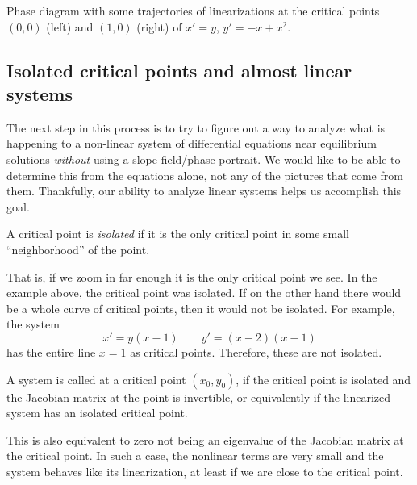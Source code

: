 \documentclass{ximera}
\begin{document}
\begin{exampleSol}
    \begin{myfig}
        \capstart
        \caption{Phase diagram with some trajectories of linearizations at the critical points $(0,0)$ (left) and $(1,0)$ (right) of $x' = y$, $y' = -x+x^2$. \label{fig:nlin-1b-lin}}
    \end{myfig}
\end{exampleSol}

\subsection{Isolated critical points and almost linear systems}
The next step in this process is to try to figure out a way to analyze what is happening to a non-linear system of differential equations near equilibrium solutions \emph{without} using a slope field/phase portrait. We would like to be able to determine this from the equations alone, not any of the pictures that come from them. Thankfully, our ability to analyze linear systems helps us accomplish this goal. 

\begin{definition}
    A critical point is \emph{isolated} if it is the only critical point in some small ``neighborhood'' of the point. 
\end{definition}
That is, if we zoom in far enough it is the only critical point we see.  In the example above, the critical point was isolated.  If on the other hand there would be a whole curve of critical points, then it would not be isolated. For example, the system
\begin{equation*}
    x' = y(x-1) \qquad y' = (x-2)(x-1)
\end{equation*}
has the entire line $x=1$ as critical points. Therefore, these are not isolated.

\begin{definition}
    A system is called \emph{} at a critical point $(x_0,y_0)$, if the critical point is isolated and the Jacobian matrix at the point is invertible, or equivalently if the linearized system has an isolated critical point.
\end{definition}
This is also equivalent to zero not being an eigenvalue of the Jacobian matrix at the critical point. In such a case, the nonlinear terms are very small and the system behaves like its linearization, at least if we are close to the critical point.
\end{document}

